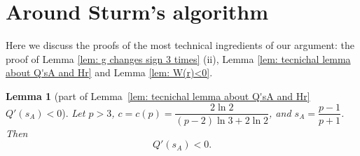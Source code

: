 \documentclass[11pt]{article}
\newtheorem{lemma}[theorem]{Lemma}
\theoremstyle{definition}
\newcommand{\1}{\mathbf{1}}
\begin{document}
\section{Around Sturm's algorithm}
\label{appendix:B}


Here we discuss the proofs of the most technical ingredients of our argument: the proof of Lemma \ref{lem: g changes sign 3 times} {(ii)}, Lemma \ref{lem: tecnichal lemma about Q'sA and Hr} and Lemma \ref{lem: W(r)<0}.

\begin{lemma}[part of Lemma~\ref{lem: tecnichal lemma about Q'sA and Hr} $Q'(s_{A})<0$]\label{lem:Qprime-sA} 
Let $p>3$, $c=c(p)=\dfrac{2\ln2}{(p-2)\ln3+2\ln2}$, and $s_A=\dfrac{p-1}{p+1}$.
Then
\[
Q'(s_A)<0.
\]
\end{lemma}
\end{document}
